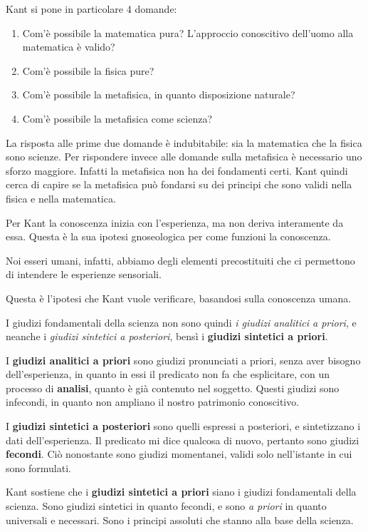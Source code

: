 \documentclass[a4paper, twoside, titlepage]{book}
\begin{document}
Kant si pone in particolare 4 domande:
\begin{enumerate}
\item Com’è possibile la matematica pura? L’approccio conoscitivo dell’uomo alla matematica è valido?
\item Com’è possibile la fisica pure?
\item Com’è possibile la metafisica, in quanto disposizione naturale?
\item Com’è possibile la metafisica come scienza?
\end{enumerate}

La risposta alle prime due domande è indubitabile: sia la matematica che la fisica sono scienze.
Per rispondere invece alle domande sulla metafisica è necessario uno sforzo maggiore. Infatti la metafisica non ha dei fondamenti certi.
Kant quindi cerca di capire se la metafisica può fondarsi su dei principi che sono validi nella fisica e nella matematica.

Per Kant la conoscenza inizia con l’esperienza, ma non deriva interamente da essa.
Questa è la sua ipotesi gnoseologica per come funzioni la conoscenza.

Noi esseri umani, infatti, abbiamo degli elementi precostituiti che ci permettono di intendere le esperienze sensoriali.

Questa è l’ipotesi che Kant vuole verificare, basandosi sulla conoscenza umana.

I giudizi fondamentali della scienza non sono quindi \textit{i giudizi analitici a priori}, e neanche i \textit{giudizi sintetici a posteriori}, bensì i \textbf{giudizi sintetici a priori}.

I \textbf{giudizi analitici a priori} sono giudizi pronunciati a priori, senza aver bisogno dell’esperienza, in quanto in essi il predicato non fa che esplicitare, con un processo di \textbf{analisi}, quanto è già contenuto nel soggetto.
Questi giudizi sono infecondi, in quanto non ampliano il nostro patrimonio conoscitivo.

I \textbf{giudizi sintetici a posteriori} sono quelli espressi a posteriori, e sintetizzano i dati dell’esperienza. Il predicato mi dice qualcosa di nuovo, pertanto sono giudizi \textbf{fecondi}. Ciò nonostante sono giudizi momentanei, validi solo nell’istante in cui sono formulati.

Kant sostiene che i \textbf{giudizi sintetici a priori} siano i giudizi fondamentali della scienza.
Sono giudizi sintetici in quanto fecondi, e sono \textit{a priori} in quanto universali e necessari.
Sono i principi assoluti che stanno alla base della scienza.
\end{document}
